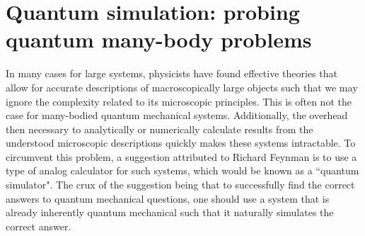 

\section{Quantum simulation: probing quantum many-body problems}

In many cases for large systems, physicists have found effective theories that allow for accurate descriptions of macroscopically large objects such that we may ignore the complexity related to its microscopic principles. This is often not the case for many-bodied quantum mechanical systems. Additionally, the overhead then necessary to analytically or numerically calculate results from the understood microscopic descriptions quickly makes these systems intractable. To circumvent this problem, a suggestion attributed to Richard Feynman \cite{Feynman1982} is to use a type of analog calculator for such systems, which would be known as a ``quantum simulator". The crux of the suggestion being that to successfully find the correct answers to quantum mechanical questions, one should use a system that is already inherently quantum mechanical such that it naturally simulates the correct answer.


